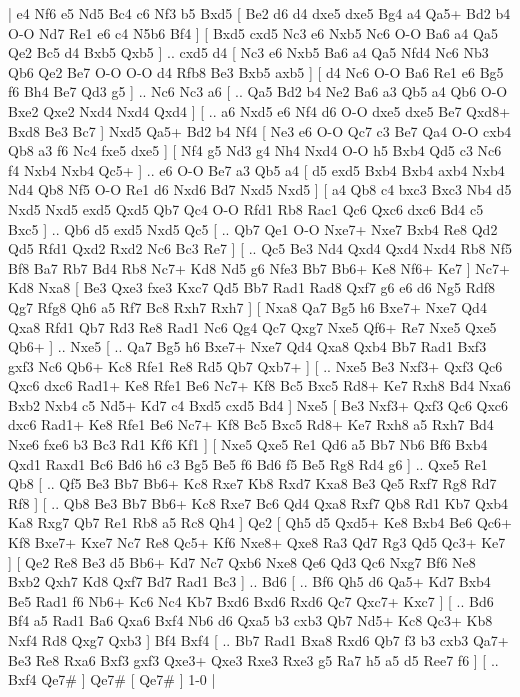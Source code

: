 \makegametitle 
|   e4   Nf6    e5   Nd5    Bc4   c6    Nf3   b5    Bxd5 [  Be2 d6  d4 dxe5  dxe5 Bg4  a4 Qa5+  Bd2 b4  O-O Nd7  Re1 e6  c4 N5b6  Bf4   ]  [  Bxd5 cxd5  Nc3 e6  Nxb5 Nc6  O-O Ba6  a4 Qa5  Qe2 Bc5  d4 Bxb5  Qxb5   ] .. cxd5    d4 [  Nc3 e6  Nxb5 Ba6  a4 Qa5  Nfd4 Nc6  Nb3 Qb6  Qe2 Be7  O-O O-O  d4 Rfb8  Be3 Bxb5  axb5   ]  [  d4 Nc6  O-O Ba6  Re1 e6  Bg5 f6  Bh4 Be7  Qd3 g5   ] .. Nc6    Nc3   a6 [ .. Qa5  Bd2 b4  Ne2 Ba6  a3 Qb5  a4 Qb6  O-O Bxe2  Qxe2 Nxd4  Nxd4 Qxd4   ]  [ .. a6  Nxd5 e6  Nf4 d6  O-O dxe5  dxe5 Be7  Qxd8+ Bxd8  Be3 Bc7   ]  Nxd5   Qa5+    Bd2   b4    Nf4 [  Ne3 e6  O-O Qc7  c3 Be7  Qa4 O-O  cxb4 Qb8  a3 f6  Nc4 fxe5  dxe5   ]  [  Nf4 g5  Nd3 g4  Nh4 Nxd4  O-O h5  Bxb4 Qd5  c3 Nc6  f4 Nxb4  Nxb4 Qc5+   ] .. e6    O-O   Be7    a3   Qb5    a4 [  d5 exd5  Bxb4 Bxb4  axb4 Nxb4  Nd4 Qb8  Nf5 O-O  Re1 d6  Nxd6 Bd7  Nxd5 Nxd5   ]  [  a4 Qb8  c4 bxc3  Bxc3 Nb4  d5 Nxd5  Nxd5 exd5  Qxd5 Qb7  Qc4 O-O  Rfd1 Rb8  Rac1 Qc6  Qxc6 dxc6  Bd4 c5  Bxc5   ] .. Qb6    d5   exd5    Nxd5   Qc5 [ .. Qb7  Qe1 O-O  Nxe7+ Nxe7  Bxb4 Re8  Qd2 Qd5  Rfd1 Qxd2  Rxd2 Nc6  Bc3 Re7   ]  [ .. Qc5  Be3 Nd4  Qxd4 Qxd4  Nxd4 Rb8  Nf5 Bf8  Ba7 Rb7  Bd4 Rb8  Nc7+ Kd8  Nd5 g6  Nfe3 Bb7  Bb6+ Ke8  Nf6+ Ke7   ]  Nc7+   Kd8    Nxa8 [  Be3 Qxe3  fxe3 Kxc7  Qd5 Bb7  Rad1 Rad8  Qxf7 g6  e6 d6  Ng5 Rdf8  Qg7 Rfg8  Qh6 a5  Rf7 Bc8  Rxh7 Rxh7   ]  [  Nxa8 Qa7  Bg5 h6  Bxe7+ Nxe7  Qd4 Qxa8  Rfd1 Qb7  Rd3 Re8  Rad1 Nc6  Qg4 Qc7  Qxg7 Nxe5  Qf6+ Re7  Nxe5 Qxe5  Qb6+   ] .. Nxe5 [ .. Qa7  Bg5 h6  Bxe7+ Nxe7  Qd4 Qxa8  Qxb4 Bb7  Rad1 Bxf3  gxf3 Nc6  Qb6+ Kc8  Rfe1 Re8  Rd5 Qb7  Qxb7+   ]  [ .. Nxe5  Be3 Nxf3+  Qxf3 Qc6  Qxc6 dxc6  Rad1+ Ke8  Rfe1 Be6  Nc7+ Kf8  Bc5 Bxc5  Rd8+ Ke7  Rxh8 Bd4  Nxa6 Bxb2  Nxb4 c5  Nd5+ Kd7  c4 Bxd5  cxd5 Bd4   ]  Nxe5 [  Be3 Nxf3+  Qxf3 Qc6  Qxc6 dxc6  Rad1+ Ke8  Rfe1 Be6  Nc7+ Kf8  Bc5 Bxc5  Rd8+ Ke7  Rxh8 a5  Rxh7 Bd4  Nxe6 fxe6  b3 Bc3  Rd1 Kf6  Kf1   ]  [  Nxe5 Qxe5  Re1 Qd6  a5 Bb7  Nb6 Bf6  Bxb4 Qxd1  Raxd1 Bc6  Bd6 h6  c3 Bg5  Be5 f6  Bd6 f5  Be5 Rg8  Rd4 g6   ] .. Qxe5    Re1   Qb8 [ .. Qf5  Be3 Bb7  Bb6+ Kc8  Rxe7 Kb8  Rxd7 Kxa8  Be3 Qe5  Rxf7 Rg8  Rd7 Rf8   ]  [ .. Qb8  Be3 Bb7  Bb6+ Kc8  Rxe7 Bc6  Qd4 Qxa8  Rxf7 Qb8  Rd1 Kb7  Qxb4 Ka8  Rxg7 Qb7  Re1 Rb8  a5 Rc8  Qh4   ]  Qe2 [  Qh5 d5  Qxd5+ Ke8  Bxb4 Be6  Qc6+ Kf8  Bxe7+ Kxe7  Nc7 Re8  Qc5+ Kf6  Nxe8+ Qxe8  Ra3 Qd7  Rg3 Qd5  Qc3+ Ke7   ]  [  Qe2 Re8  Be3 d5  Bb6+ Kd7  Nc7 Qxb6  Nxe8 Qe6  Qd3 Qc6  Nxg7 Bf6  Ne8 Bxb2  Qxh7 Kd8  Qxf7 Bd7  Rad1 Bc3   ] .. Bd6 [ .. Bf6  Qh5 d6  Qa5+ Kd7  Bxb4 Be5  Rad1 f6  Nb6+ Kc6  Nc4 Kb7  Bxd6 Bxd6  Rxd6 Qc7  Qxc7+ Kxc7   ]  [ .. Bd6  Bf4 a5  Rad1 Ba6  Qxa6 Bxf4  Nb6 d6  Qxa5 b3  cxb3 Qb7  Nd5+ Kc8  Qc3+ Kb8  Nxf4 Rd8  Qxg7 Qxb3   ]  Bf4   Bxf4 [ .. Bb7  Rad1 Bxa8  Rxd6 Qb7  f3 b3  cxb3 Qa7+  Be3 Re8  Rxa6 Bxf3  gxf3 Qxe3+  Qxe3 Rxe3  Rxe3 g5  Ra7 h5  a5 d5  Ree7 f6   ]  [ .. Bxf4  Qe7#   ]  Qe7#    [  Qe7#   ] 1-0  |
